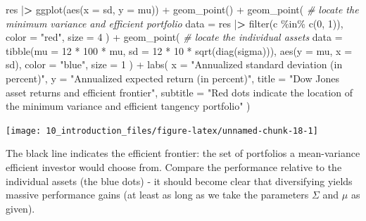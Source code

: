 \documentclass[
]{book}
\newenvironment{Shaded}{\begin{snugshade}}{\end{snugshade}}
\newcommand{\AttributeTok}[1]{\textcolor[rgb]{0.61,0.61,0.61}{#1}}
\newcommand{\CommentTok}[1]{\textcolor[rgb]{0.37,0.37,0.37}{\textit{#1}}}
\newcommand{\DecValTok}[1]{\textcolor[rgb]{0.06,0.06,0.06}{#1}}
\newcommand{\ErrorTok}[1]{\textcolor[rgb]{0.14,0.14,0.14}{\textbf{#1}}}
\newcommand{\FunctionTok}[1]{\textcolor[rgb]{0,0,0}{#1}}
\newcommand{\NormalTok}[1]{#1}
\newcommand{\SpecialCharTok}[1]{\textcolor[rgb]{0,0,0}{#1}}
\newcommand{\StringTok}[1]{\textcolor[rgb]{0.5,0.5,0.5}{#1}}
\begin{document}
\begin{Shaded}
\begin{Highlighting}[]
\NormalTok{res }\SpecialCharTok{|}\ErrorTok{\textgreater{}}
  \FunctionTok{ggplot}\NormalTok{(}\FunctionTok{aes}\NormalTok{(}\AttributeTok{x =}\NormalTok{ sd, }\AttributeTok{y =}\NormalTok{ mu)) }\SpecialCharTok{+}
  \FunctionTok{geom\_point}\NormalTok{() }\SpecialCharTok{+}
  \FunctionTok{geom\_point}\NormalTok{( }\CommentTok{\# locate the minimum variance and efficient portfolio}
    \AttributeTok{data =}\NormalTok{ res }\SpecialCharTok{|}\ErrorTok{\textgreater{}} \FunctionTok{filter}\NormalTok{(c }\SpecialCharTok{\%in\%} \FunctionTok{c}\NormalTok{(}\DecValTok{0}\NormalTok{, }\DecValTok{1}\NormalTok{)),}
    \AttributeTok{color =} \StringTok{"red"}\NormalTok{,}
    \AttributeTok{size =} \DecValTok{4}
\NormalTok{  ) }\SpecialCharTok{+}
  \FunctionTok{geom\_point}\NormalTok{( }\CommentTok{\# locate the individual assets}
    \AttributeTok{data =} \FunctionTok{tibble}\NormalTok{(}\AttributeTok{mu =} \DecValTok{12} \SpecialCharTok{*} \DecValTok{100} \SpecialCharTok{*}\NormalTok{ mu, }\AttributeTok{sd =} \DecValTok{12} \SpecialCharTok{*} \DecValTok{10} \SpecialCharTok{*} \FunctionTok{sqrt}\NormalTok{(}\FunctionTok{diag}\NormalTok{(sigma))),}
    \FunctionTok{aes}\NormalTok{(}\AttributeTok{y =}\NormalTok{ mu, }\AttributeTok{x =}\NormalTok{ sd), }\AttributeTok{color =} \StringTok{"blue"}\NormalTok{, }\AttributeTok{size =} \DecValTok{1}
\NormalTok{  ) }\SpecialCharTok{+}
  \FunctionTok{labs}\NormalTok{(}
    \AttributeTok{x =} \StringTok{"Annualized standard deviation (in percent)"}\NormalTok{,}
    \AttributeTok{y =} \StringTok{"Annualized expected return (in percent)"}\NormalTok{,}
    \AttributeTok{title =} \StringTok{"Dow Jones asset returns and efficient frontier"}\NormalTok{,}
    \AttributeTok{subtitle =} \StringTok{"Red dots indicate the location of the minimum variance and efficient tangency portfolio"}
\NormalTok{  )}
\end{Highlighting}
\end{Shaded}

\begin{center}\texttt{[image: 10\_introduction\_files/figure-latex/unnamed-chunk-18-1]} \end{center}

The black line indicates the efficient frontier: the set of portfolios a mean-variance efficient investor would choose from. Compare the performance relative to the individual assets (the blue dots) - it should become clear that diversifying yields massive performance gains (at least as long as we take the parameters \(\Sigma\) and \(\mu\) as given).
\end{document}
